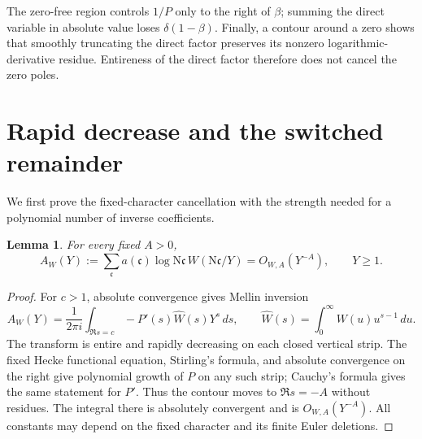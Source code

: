 \documentclass[11pt]{article}
\newtheorem{lemma}[theorem]{Lemma}
\newcommand{\N}{\mathrm N}
\begin{document}
The zero-free region controls $1/P$ only to the right of $\beta$;
summing the direct variable in absolute value loses
$\delta(1-\beta)$. Finally, a contour around a zero shows that
smoothly truncating the direct factor preserves its nonzero
logarithmic-derivative residue. Entireness of the direct factor
therefore does not cancel the zero poles.

\section{Rapid decrease and the switched remainder}
We first prove the fixed-character cancellation with the strength
needed for a polynomial number of inverse coefficients.

\begin{lemma}\label{lem:rapid}
For every fixed $A>0$,
\[
 A_W(Y):=\sum_{\mathfrak c}a(\mathfrak c)\log\N\mathfrak c\,
 W(\N\mathfrak c/Y)=O_{W,A}(Y^{-A}),\qquad Y\ge1.             \tag{2.1}
\]
\end{lemma}
\begin{proof}
For $c>1$, absolute convergence gives Mellin inversion
\[
 A_W(Y)=\frac1{2\pi i}\int_{\Re s=c}
              -P'(s)\widehat W(s)Y^s\,ds,\qquad
 \widehat W(s)=\int_0^\infty W(u)u^{s-1}\,du.
\]
The transform is entire and rapidly decreasing on each closed
vertical strip. The fixed Hecke functional equation, Stirling's
formula, and absolute convergence on the right give polynomial
growth of $P$ on any such strip; Cauchy's formula gives the
same statement for $P'$. Thus the contour moves to $\Re s=-A$
without residues. The integral there is absolutely convergent
and is $O_{W,A}(Y^{-A})$. All constants may depend on the
fixed character and its finite Euler deletions.
\end{proof}
\end{document}
